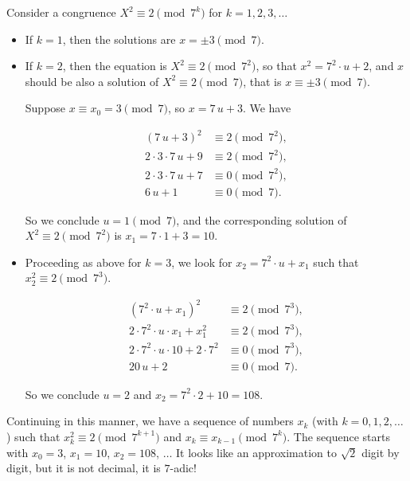\documentclass{article}
\newcommand{\examplesymbol}{$\blacktriangle$}
\renewcommand{\qedsymbol}{$\blacksquare$}
\theoremstyle{myplain}
\theoremstyle{mydefinition}
\newenvironment{example}
  {\pushQED{\qed}\renewcommand{\qedsymbol}{\examplesymbol}\examplex}
  {\popQED\endexamplex}
\begin{document}
\begin{example}\label{example:sqrt-2}
  Consider a congruence $X^2 \equiv 2 \pmod{7^k}$ for $k = 1, 2, 3, \ldots$

  \begin{itemize}
  \item If \underline{$k = 1$}, then the solutions are $x = \pm 3 \pmod{7}$.

  \item If \underline{$k = 2$}, then the equation is $X^2 \equiv 2 \pmod{7^2}$,
    so that $x^2 = 7^2\cdot u + 2$, and $x$ should be also a solution of
    $X^2 \equiv 2 \pmod{7}$, that is $x \equiv \pm 3 \pmod{7}$.

    Suppose $x \equiv x_0 = 3 \pmod{7}$, so $x = 7\,u + 3$. We have

    \begin{align*}
      (7\,u + 3)^2 & \equiv 2 \pmod{7^2},\\
      2\cdot 3\cdot 7\, u + 9 & \equiv 2 \pmod{7^2},\\
      2\cdot 3\cdot 7\, u + 7 & \equiv 0 \pmod{7^2},\\
      6\,u + 1 & \equiv 0 \pmod{7}.
    \end{align*}

    So we conclude $u = 1 \pmod{7}$, and the corresponding solution of
    $X^2 \equiv 2 \pmod{7^2}$ is $x_1 = 7\cdot 1 + 3 = 10$.

  \item Proceeding as above for \underline{$k = 3$}, we look for
    $x_2 = 7^2\cdot u + x_1$ such that $x_2^2 \equiv 2 \pmod{7^3}$.

    \begin{align*}
      (7^2\cdot u + x_1)^2 & \equiv 2 \pmod{7^3},\\
      2\cdot 7^2 \cdot u\cdot x_1 + x_1^2 & \equiv 2 \pmod{7^3},\\
      2\cdot 7^2 \cdot u\cdot 10 + 2\cdot 7^2 & \equiv 0 \pmod{7^3},\\
      20 \, u + 2 & \equiv 0 \pmod{7}.
    \end{align*}

    So we conclude $u = 2$ and $x_2 = 7^2\cdot 2 + 10 = 108$.
  \end{itemize}

  Continuing in this manner, we have a sequence of numbers $x_k$ (with
  $k = 0,1,2,\ldots$) such that $x_k^2 \equiv 2 \pmod{7^{k+1}}$ and
  $x_k \equiv x_{k-1} \pmod{7^k}$. The sequence starts with $x_0 = 3$,
  $x_1 = 10$, $x_2 = 108$, $\ldots$ It looks like an approximation to $\sqrt{2}$
  digit by digit, but it is not decimal, it is $7$-adic!
\end{example}
\end{document}
